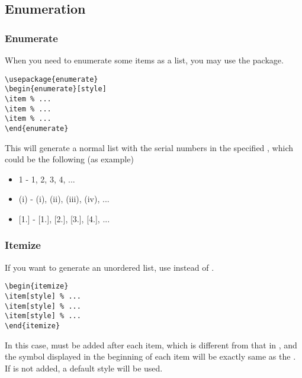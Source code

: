 \subsection{Enumeration}
\begin{frame}[fragile]
    \frametitle{Enumerate}
    When you need to enumerate some items as a list, you may use the  package.
    \begin{command}
        \begin{verbatim}
\usepackage{enumerate}
\begin{enumerate}[style]
\item % ...
\item % ...
\item % ...
\end{enumerate}
		\end{verbatim}
    \end{command}
    This will generate a normal list with the serial numbers in the specified , which could be the following (as example)
    \begin{itemize}
        \item \alert{1} - 1, 2, 3, 4, ...
        \item \alert{(i)} - (i), (ii), (iii), (iv), ...
        \item \alert{[1.]} - [1.], [2.], [3.], [4.], ...
    \end{itemize}
\end{frame}

\begin{frame}[fragile]
    \frametitle{Itemize}
    If you want to generate an unordered list, use  instead of .
    \begin{command}
        \begin{verbatim}
\begin{itemize}
\item[style] % ...
\item[style] % ...
\item[style] % ...
\end{itemize}
		\end{verbatim}
    \end{command}
    In this case,  must be added after each item, which is different from that in , and the symbol displayed in the beginning of each item will be exactly same as the . If  is not added, a default style will be used.
\end{frame}

